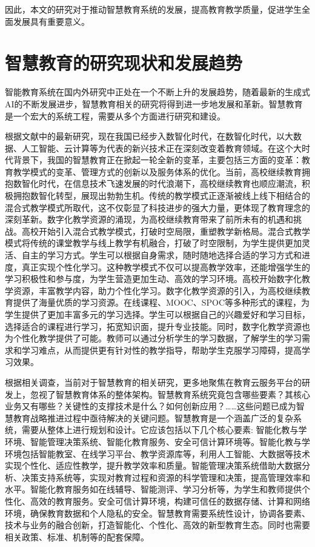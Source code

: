 \documentclass[oneside]{xduugthesis}
\begin{document}
因此，本文的研究对于推动智慧教育系统的发展，提高教育教学质量，促进学生全面发展具有重要意义。

\section{智慧教育的研究现状和发展趋势}

智能教育系统在国内外研究中正处在一个不断上升的发展趋势，随着最新的生成式AI的不断发展进步，智慧教育相关的研究将得到进一步地发展和革新\cite{焦建利2023chatgpt}。智慧教育是一个宏大的系统工程，需要从多个方面进行研究和建设。

根据\cite{数智化时代高校继续教育智慧化发展}文献中的最新研究，现在我国已经步入数智化时代，在数智化时代，以大数据、人工智能、云计算等为代表的新兴技术正在深刻改变着教育领域。在这个大时代背景下，我国的智慧教育正在掀起一轮全新的变革，主要包括三方面的变革：教育教学模式的变革、管理方式的创新以及服务体系的优化。当前，高校继续教育拥抱数智化时代，在信息技术飞速发展的时代浪潮下，高校继续教育也顺应潮流，积极拥抱数智化转型，展现出勃勃生机。传统的教学模式正逐渐被线上线下相结合的混合式教学模式所取代，这不仅彰显了科技进步的强大力量，更体现了教育理念的深刻革新。数字化教学资源的涌现，为高校继续教育带来了前所未有的机遇和挑战。高校开始引入混合式教学模式，打破时空局限，重塑教学新格局。混合式教学模式将传统的课堂教学与线上教学有机融合，打破了时空限制，为学生提供更加灵活、自主的学习方式。学生可以根据自身需求，随时随地选择合适的学习方式和进度，真正实现个性化学习。这种教学模式不仅可以提高教学效率，还能增强学生的学习积极性和参与度，为学生营造更加生动、高效的学习环境。高校开始数字化教学资源，丰富教学内容，助力个性化学习。数字化教学资源的引入，为高校继续教育提供了海量优质的学习资源。在线课程、MOOC、SPOC等多种形式的课程，为学生提供了更加丰富多元的学习选择。学生可以根据自己的兴趣爱好和学习目标，选择适合的课程进行学习，拓宽知识面，提升专业技能。同时，数字化教学资源也为个性化教学提供了可能。教师可以通过分析学生的学习数据，了解学生的学习需求和学习难点，从而提供更有针对性的教学指导，帮助学生克服学习障碍，提高学习效果。

根据相关调查\cite{杨现民2015智慧教育体系架构与关键支撑技术}，当前对于智慧教育的相关研究，更多地聚焦在教育云服务平台的研发上，忽视了智慧教育体系的整体架构。智慧教育系统究竟包含哪些要素？其核心业务又有哪些？关键性的支撑技术是什么？如何创新应用？……这些问题已成为智慧教育战略推进过程中亟待解决的关键问题。智慧教育是一个涵盖广泛的复杂系统，需要从整体上进行规划和设计。它应该包括以下几个核心要素:
智能化教与学环境、智能管理决策系统、智能化教育服务、安全可信计算环境等。智能化教与学环境包括智能教室、在线学习平台、教学资源库等，利用人工智能、大数据等技术实现个性化、适应性教学，提升教学效率和质量。智能管理决策系统借助大数据分析、决策支持系统等，实现对教育过程和资源的科学管理和决策，提高管理效率和水平。智能化教育服务如在线辅导、智能测评、学习分析等，为学生和教师提供个性化、高效的教育服务。安全可信计算环境，构建可信任的数据存储、计算和网络环境，确保教育数据和个人隐私的安全。智慧教育需要系统性设计，协调各要素、技术与业务的融合创新，打造智能化、个性化、高效的新型教育生态。同时也需要相关政策、标准、机制等的配套保障。
\end{document}
